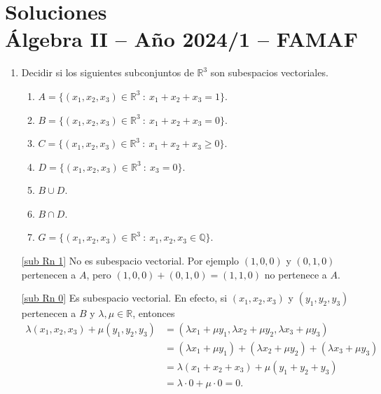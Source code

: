 
\chapter{Soluciones\\Álgebra  II -- Año 2024/1 -- FAMAF}\label{practico-6}


\begin{enumerate}[topsep=6pt, itemsep=.4cm]

    
    \item\label{sub Rn} Decidir si los siguientes subconjuntos de $\mathbb{R}^3$ son subespacios vectoriales.
        \begin{enumerate}
            \item\label{sub Rn 1} $A=\{(x_1, x_2 ,x_3) \in \mathbb{R}^3 \ : \ x_1 + x_2 + x_3=1\}$.
            \item\label{sub Rn 0} $B=\{(x_1, x_2 ,x_3) \in \mathbb{R}^3 \ : \ x_1 + x_2 + x_3=0\}$.
            \item\label{sub Rn geq} $C=\{(x_1, x_2 ,x_3) \in \mathbb{R}^3 \ : \ x_1 + x_2 + x_3 \geq 0\}$.
            \item\label{sub Rn 1 30} $D=\{(x_1, x_2 ,x_3) \in \mathbb{R}^3 \ : \ x_3=0\}$.
            \item\label{sub Rn cup} $B\cup D$.
            \item\label{sub Rn cap} $B\cap D$.
            \item\label{sub Rn q} $G=\{(x_1, x_2 ,x_3) \in \mathbb{R}^3 \ :\ x_1, x_2, x_3\in\mathbb{Q}\}$.
        \end{enumerate}
        
    \rta 

    \ref{sub Rn 1} No es subespacio vectorial. Por ejemplo $(1,0,0)$ y $(0,1,0)$ pertenecen a $A$, pero $(1,0,0)+(0,1,0)=(1,1,0)$ no pertenece a $A$.

    \ref{sub Rn 0} Es subespacio vectorial. En efecto, si $(x_1, x_2 ,x_3)$ y $(y_1, y_2 ,y_3)$ pertenecen a $B$ y $\lambda,\mu\in\mathbb{R}$, entonces
    \begin{align*}
        \lambda(x_1, x_2 ,x_3)+\mu(y_1, y_2 ,y_3)&=(\lambda x_1+\mu y_1, \lambda x_2+\mu y_2, \lambda x_3+\mu y_3)\\
        &=(\lambda x_1+\mu y_1)+(\lambda x_2+\mu y_2)+(\lambda x_3+\mu y_3)\\
        &=\lambda(x_1+ x_2 + x_3)+\mu(y_1+ y_2 + y_3)\\
        &=\lambda\cdot 0+\mu\cdot 0=0.
    \end{align*}


\end{enumerate}
